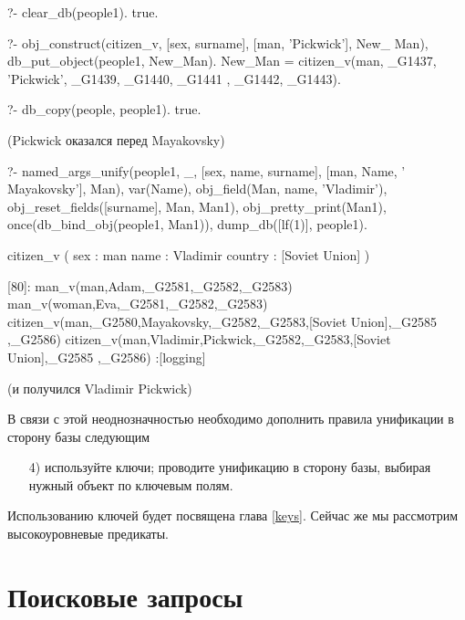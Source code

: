 \documentclass[a4paper]{book}
\begin{document}
\begin{example}{}{}
?- clear_db(people1).
true.

?- obj_construct(citizen_v, [sex, surname], [man, 'Pickwick'], New_
Man), db_put_object(people1, New_Man).
New_Man = citizen_v(man, _G1437, 'Pickwick', _G1439, _G1440, _G1441
, _G1442, _G1443).                                                

?- db_copy(people, people1).
true.
\end{example}

(Pickwick оказался перед Mayakovsky)

\begin{example}{}{}
?- named_args_unify(people1, _, 
      [sex, name, surname], [man, Name, ' Mayakovsky'], Man), 
   var(Name), 
   obj_field(Man, name, 'Vladimir'), 
   obj_reset_fields([surname], Man, Man1), 
   obj_pretty_print(Man1), 
   once(db_bind_obj(people1, Man1)), 
   dump_db([lf(1)], people1).

citizen_v ( 
  sex : man 
  name : Vladimir 
  country : [Soviet Union] 
) 

[80]: man_v(man,Adam,_G2581,_G2582,_G2583) 
man_v(woman,Eva,_G2581,_G2582,_G2583) 
citizen_v(man,_G2580,Mayakovsky,_G2582,_G2583,[Soviet Union],_G2585
,_G2586)                                                          
citizen_v(man,Vladimir,Pickwick,_G2582,_G2583,[Soviet Union],_G2585
,_G2586)                                                          
 :[logging]
\end{example}

(и получился Vladimir Pickwick)

В связи с этой неоднозначностью необходимо дополнить правила
унификации в сторону базы следующим

\begin{itemize}
\item[4)] используйте ключи; проводите унификацию в сторону базы,
  выбирая нужный объект по ключевым полям.
\end{itemize}

Использованию ключей будет посвящена глава \ref{keys}. Сейчас же
мы рассмотрим высокоуровневые предикаты. 

\section{Поисковые запросы}
\end{document}
